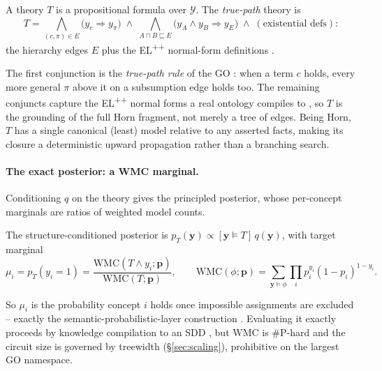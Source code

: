 \documentclass[anon]{nesy2026}
\newcommand{\WMC}{\ensuremath{\mathrm{WMC}}}
\newcommand{\bC}[1]{\boldsymbol{#1}}
\begin{document}
\begin{definition}
A theory $T$ is a propositional formula over $\mathcal Y$. The \emph{true-path} theory is
\[
T=\bigwedge_{(c,\pi)\in E}\bigl(y_c\!\Rightarrow\!y_\pi\bigr)\;\wedge\;
\bigwedge_{A\sqcap B\sqsubseteq E}\bigl(y_A\wedge y_B\!\Rightarrow\!y_E\bigr)\;\wedge\;(\text{existential defs}):
\]
the hierarchy edges $E$ plus the EL\textsuperscript{++} normal-form definitions
\citep{baader2005elenvelope,kazakov2014elk}.
\end{definition}

The first conjunction is the \emph{true-path rule} of the GO \citep{ashburner2000go}: when a term
$c$ holds, every more general $\pi$ above it on a subsumption edge holds too. The remaining
conjuncts capture the EL\textsuperscript{++} normal forms a real ontology compiles to
\citep{baader2005elenvelope,kazakov2014elk}, so $T$ is the grounding of the full Horn fragment,
not merely a tree of edges. Being Horn, $T$ has a single canonical (least) model relative to any
asserted facts, making its closure a deterministic upward propagation rather than a branching
search.

\paragraph{The exact posterior: a WMC marginal.}
Conditioning $q$ on the theory gives the principled posterior, whose per-concept marginals are
ratios of weighted model counts.

\begin{definition}
The structure-conditioned posterior is $p_T(\bC y)\propto[\bC y\models T]\,q(\bC y)$, with target
marginal
\[
\mu_i=p_T(y_i{=}1)=\frac{\WMC(T\wedge y_i;\bC p)}{\WMC(T;\bC p)},\qquad
\WMC(\phi;\bC p)=\!\!\sum_{\bC y\models\phi}\prod_i p_i^{y_i}(1-p_i)^{1-y_i}.
\]
\end{definition}

So $\mu_i$ is the probability concept $i$ holds once impossible assignments are excluded -- exactly
the semantic-probabilistic-layer construction \citep{ahmed2022spl,xu2018semanticloss}. Evaluating it
exactly proceeds by knowledge compilation to an SDD \citep{darwiche2011sdd}, but $\WMC$ is $\#$P-hard
\citep{chavira2008wmc} and the circuit size is governed by treewidth (\S\ref{sec:scaling}),
prohibitive on the largest GO namespace.
\end{document}
